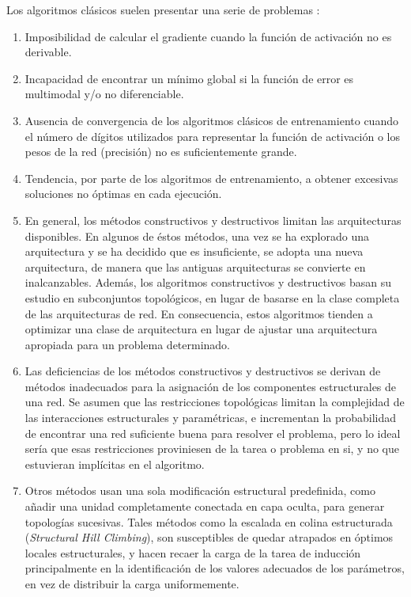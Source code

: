 Los algoritmos clásicos suelen presentar una serie de problemas \cite{Angeline1994,
Yao1999}:
\begin{enumerate}
\item Imposibilidad de calcular el gradiente cuando la función de activación no es
derivable.
\item Incapacidad de encontrar un mínimo global si la función de error es multimodal
y/o no diferenciable.
\item Ausencia de convergencia de los algoritmos clásicos de entrenamiento cuando el
número de dígitos utilizados para representar la
función de activación o los pesos de la red (precisión) no es suficientemente grande.
\item Tendencia, por parte de los algoritmos de entrenamiento, a obtener excesivas
soluciones no óptimas en cada ejecución.
\item En general, los métodos constructivos y destructivos limitan las arquitecturas
disponibles. En algunos de éstos métodos, una vez se ha explorado una arquitectura y se ha decidido
que es insuficiente, se adopta una nueva arquitectura,
de manera que las antiguas arquitecturas se convierte en inalcanzables. Además, los
algoritmos constructivos y destructivos basan su estudio en subconjuntos topológicos,
en lugar de basarse en la clase completa de las arquitecturas de red. En consecuencia,
estos	algoritmos tienden a optimizar una clase de arquitectura en lugar de ajustar una
arquitectura apropiada para un problema determinado.
\item Las deficiencias de los métodos constructivos y destructivos se derivan de
métodos 	inadecuados para la asignación de los componentes estructurales
de una red. Se asumen que las restricciones topológicas limitan la complejidad de las
interacciones	estructurales y paramétricas, e incrementan la probabilidad de
encontrar una red suficiente buena para resolver el problema, pero lo ideal sería que
esas restricciones proviniesen de la tarea o problema en si, y no que estuvieran
implícitas en el algoritmo.
\item Otros métodos usan una sola modificación estructural predefinida, como añadir una
unidad completamente conectada en capa oculta, para generar topologías sucesivas.
Tales métodos como la escalada en colina estructurada (\textit{Structural Hill
Climbing}), son susceptibles de quedar atrapados en óptimos locales estructurales, y
hacen recaer la carga de la tarea de inducción principalmente en la
identificación de los valores adecuados de los parámetros, en vez de distribuir
la carga uniformemente.
\end{enumerate}

